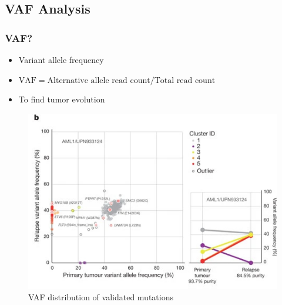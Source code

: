 \documentclass{beamer}
\begin{document}
    \subsection{VAF Analysis}
    \begin{frame}
        \frametitle{VAF?}

        \begin{itemize}
            \item Variant allele frequency
            \item $\textrm{VAF} = \textrm{Alternative allele read count} / \textrm{Total read count}$
            \item To find tumor evolution
        \end{itemize}

        \begin{figure}
            \includegraphics[width=0.4 \linewidth]{figures/VAF/VAF.jpg}
            \caption{VAF distribution of validated mutations \protect\cite{VAF1}}
        \end{figure}
    \end{frame}
\end{document}
